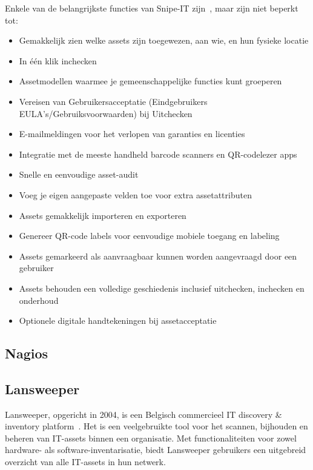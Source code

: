 Enkele van de belangrijkste functies van Snipe-IT zijn~\autocite{snipe-it-features}, maar zijn niet beperkt tot:
\begin{itemize}
    \item Gemakkelijk zien welke assets zijn toegewezen, aan wie, en hun fysieke locatie
    \item In één klik inchecken
    \item Assetmodellen waarmee je gemeenschappelijke functies kunt groeperen
    \item Vereisen van Gebruikersacceptatie (Eindgebruikers EULA's/Gebruiksvoorwaarden) bij Uitchecken
    \item E-mailmeldingen voor het verlopen van garanties en licenties
    \item Integratie met de meeste handheld barcode scanners en QR-codelezer apps
    \item Snelle en eenvoudige asset-audit
    \item Voeg je eigen aangepaste velden toe voor extra assetattributen
    \item Assets gemakkelijk importeren en exporteren
    \item Genereer QR-code labels voor eenvoudige mobiele toegang en labeling
    \item Assets gemarkeerd als aanvraagbaar kunnen worden aangevraagd door een gebruiker
    \item Assets behouden een volledige geschiedenis inclusief uitchecken, inchecken en onderhoud
    \item Optionele digitale handtekeningen bij assetacceptatie
\end{itemize}

\subsection{Nagios}
\label{sub:nagios}

\subsection{Lansweeper}
\label{sub:lansweeper}

Lansweeper, opgericht in 2004, is een Belgisch commercieel IT discovery \& inventory platform~\autocite{lansweeper-history}.
Het is een veelgebruikte tool voor het scannen, bijhouden en beheren van IT-assets binnen een organisatie.
Met functionaliteiten voor zowel hardware- als software-inventarisatie, biedt Lansweeper gebruikers een uitgebreid overzicht van alle IT-assets in hun netwerk.

